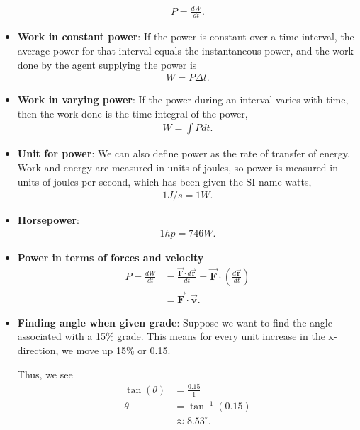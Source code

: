 \documentclass{report}
\begin{document}
\begin{itemize}
        \begin{align*}
            P = \frac{dW}{dt}
        .\end{align*}
    \item \textbf{Work in constant power}: If the power is constant over a time interval, the average power for that interval equals the instantaneous power, and the work done by the agent supplying the power is
        \begin{align*}
            W = P\Delta t
        .\end{align*}
    \item \textbf{Work in varying power}: If the power during an interval varies with time, then the work done is the time integral of the power,
        \begin{align*}
            W = \int Pdt
        .\end{align*}
    \item \textbf{Unit for power}:  We can also define power as the rate of transfer of energy. Work and energy are measured in units of joules, so power is measured in units of joules per second, which has been given the SI name watts,
        \begin{align*}
            1 J/s = 1 W
        .\end{align*}
    \item \textbf{Horsepower}:
        \begin{align*}
            1hp = 746 W
        .\end{align*}
    \item \textbf{Power in terms of forces and velocity}
        \begin{align*}
            P = \frac{dW}{dt} &= \frac{\vec{\mathbf{F}} \cdot d\vec{\mathbf{r}}}{dt} = \vec{\mathbf{F}} \cdot \left(\frac{d\vec{\mathbf{r}}}{dt}\right) \\
            &=\vec{\mathbf{F}} \cdot \vec{\mathbf{v}}
        .\end{align*}
    \item \textbf{Finding angle when given grade}: Suppose we want to find the angle associated with a 15\% grade. This means for every unit increase in the x-direction, we move up 15\% or 0.15.
        \bigbreak \noindent 
\begin{figure}[ht]
    \centering
    \label{fig:grade}
\end{figure}
\bigbreak \noindent 
Thus, we see
\begin{align*}
    \tan{\left(\theta \right)} &= \frac{0.15}{1} \\
    \theta &=\tan^{-1}{\left(0.15\right)} \\
           &\approx 8.53^{\circ}
.\end{align*}
    \end{itemize}
\end{document}
